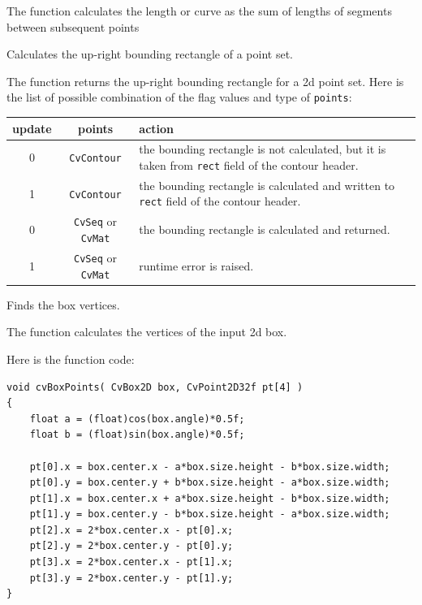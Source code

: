 The function calculates the length or curve as the sum of lengths of segments between subsequent points

Calculates the up-right bounding rectangle of a point set.


\begin{description}
\end{description}

The function returns the up-right bounding rectangle for a 2d point set.
Here is the list of possible combination of the flag values and type of \texttt{points}:

\begin{tabular}{|c|c|p{3in}|}
\hline
update & points & action \\ \hline
0 & \texttt{CvContour\*} & the bounding rectangle is not calculated, but it is taken from \texttt{rect} field of the contour header.\\ \hline
1 & \texttt{CvContour\*} & the bounding rectangle is calculated and written to \texttt{rect} field of the contour header.\\ \hline
0 & \texttt{CvSeq\*} or \texttt{CvMat\*} & the bounding rectangle is calculated and returned.\\ \hline
1 & \texttt{CvSeq\*} or \texttt{CvMat\*} & runtime error is raised.\\ \hline
\end{tabular}

Finds the box vertices.


\begin{description}
\end{description}

The function calculates the vertices of the input 2d box.

\ifC
Here is the function code:

\begin{lstlisting}
void cvBoxPoints( CvBox2D box, CvPoint2D32f pt[4] )
{
    float a = (float)cos(box.angle)*0.5f;
    float b = (float)sin(box.angle)*0.5f;

    pt[0].x = box.center.x - a*box.size.height - b*box.size.width;
    pt[0].y = box.center.y + b*box.size.height - a*box.size.width;
    pt[1].x = box.center.x + a*box.size.height - b*box.size.width;
    pt[1].y = box.center.y - b*box.size.height - a*box.size.width;
    pt[2].x = 2*box.center.x - pt[0].x;
    pt[2].y = 2*box.center.y - pt[0].y;
    pt[3].x = 2*box.center.x - pt[1].x;
    pt[3].y = 2*box.center.y - pt[1].y;
}
\end{lstlisting}
\fi

